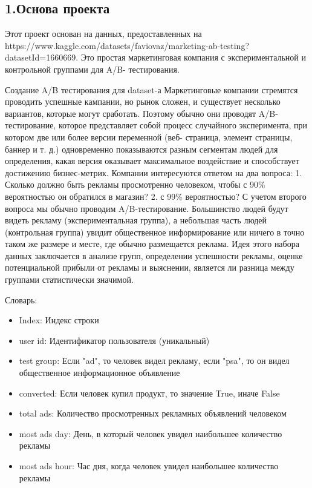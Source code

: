 \documentclass[specialist,
               substylefile = spbu_report.rtx,
               subf,href,colorlinks=true, 12pt]{disser}
\begin{document}
    \subsection{1.Основа проекта}
    Этот проект основан на данных, предоставленных на
    https://www.kaggle.com/datasets/faviovaz/marketing-ab-testing?datasetId=1660669. Это
    простая маркетинговая компания с экспериментальной и контрольной группами для A/B-
    тестирования.


    Создание A/B тестирования для dataset-а Маркетинговые компании стремятся проводить
    успешные кампании, но рынок сложен, и существует несколько вариантов, которые могут
    сработать. Поэтому обычно они проводят A/B-тестирование, которое представляет собой
    процесс случайного эксперимента, при котором две или более версии переменной (веб-
    страница, элемент страницы, баннер и т. д.) одновременно показываются разным
    сегментам людей для определения, какая версия оказывает максимальное воздействие и
    способствует достижению бизнес-метрик.
    Компании интересуются ответом на два вопроса:
    1. Сколько должно быть рекламы просмотренно человеком, чтобы с 90\% вероятностью он обратился в магазин?
    2. с 99\% вероятностью?
    С учетом второго вопроса мы обычно проводим A/B-тестирование. Большинство людей
    будут видеть рекламу (экспериментальная группа), а небольшая часть людей (контрольная
    группа) увидит общественное информирование или ничего в точно таком же размере и
    месте, где обычно размещается реклама.
    Идея этого набора данных заключается в анализе групп, определении успешности
    рекламы, оценке потенциальной прибыли от рекламы и выяснении, является ли разница
    между группами статистически значимой.

    Словарь:

    \begin{itemize}
   
        \item Index: Индекс строки
        \item user id: Идентификатор пользователя (уникальный)
        \item test group: Если "ad", то человек видел рекламу, если "psa", то он видел
        общественное информационное объявление
        \item converted: Если человек купил продукт, то значение True, иначе False
        \item total ads: Количество просмотренных рекламных объявлений человеком
        \item most ads day: День, в который человек увидел наибольшее количество рекламы
        \item most ads hour: Час дня, когда человек увидел наибольшее количество рекламы
    \end{itemize}
\end{document}

